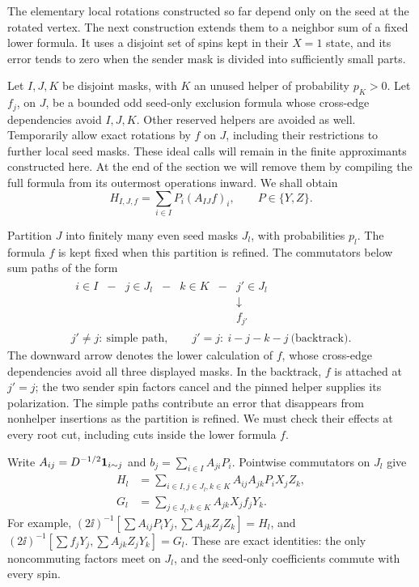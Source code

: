 The elementary local rotations constructed so far depend only on the
seed at the rotated vertex.  The next construction extends them to a
neighbor sum of a fixed lower formula.  It uses a disjoint set of
spins kept in their \(X=1\) state, and its error tends to zero when the sender
mask is divided into sufficiently small parts.

Let \(I,J,K\) be disjoint masks, with \(K\) an unused helper of
probability \(p_K>0\).  Let \(f_j\), on \(J\), be a bounded odd
seed-only exclusion formula whose cross-edge dependencies avoid
\(I,J,K\).  Other reserved helpers are avoided as well.  Temporarily
allow exact rotations by \(f\) on \(J\), including their restrictions
to further local seed masks.  These ideal calls will remain in the
finite approximants constructed here.  At the end of the section we
will remove them by compiling the full formula from its outermost
operations inward.  We shall obtain
\begin{equation}
 H_{I,J,f}=\sum_{i\in I}P_i(A_{IJ}f)_i,
 \qquad P\in\{Y,Z\}.
 \label{eq:desired-propagation}
\end{equation}

Partition \(J\) into finitely many even seed masks \(J_l\), with
probabilities \(p_l\).  The formula \(f\) is kept fixed when this
partition is refined.  The commutators below sum paths of the form
\begin{equation}
 \begin{gathered}
 \begin{array}{ccccccc}
 i\in I&-&j\in J_l&-&k\in K&-&j'\in J_l\\
 &&&&&&\downarrow\\[-2pt]
 &&&&&&f_{j'}
 \end{array}\\
 j'\ne j:\ \text{simple path},\qquad
 j'=j:\ i-j-k-j\ \text{(backtrack)}.
 \end{gathered}
 \label{eq:helper-path-schematic}
\end{equation}
The downward arrow denotes the lower calculation of \(f\), whose
cross-edge dependencies avoid all three displayed masks.  In the
backtrack, \(f\) is attached at \(j'=j\); the two sender spin
factors cancel and the pinned helper supplies its polarization.
The simple paths contribute an error that
disappears from nonhelper insertions as the partition is refined.
We must check their effects at every root cut, including cuts
inside the lower formula \(f\).

Write \(A_{ij}=D^{-1/2}\mathbf 1_{i\sim j}\) and
\(b_j=\sum_{i\in I}A_{ji}P_i\).  Pointwise commutators on \(J_l\)
give
\begin{align}
 H_l&=\sum_{i\in I,j\in J_l,k\in K}
       A_{ij}A_{jk}P_iX_jZ_k,\\
 G_l&=\sum_{j\in J_l,k\in K}A_{jk}X_jf_jY_k.
 \label{eq:two-helper-generators}
\end{align}
For example, \((2\ii)^{-1}[\sum A_{ij}P_iY_j,
\sum A_{jk}Z_jZ_k]=H_l\), and
\((2\ii)^{-1}[\sum f_jY_j,\sum A_{jk}Z_jY_k]=G_l\).
These are exact identities: the only noncommuting factors meet on
\(J_l\), and the seed-only coefficients commute with every spin.

